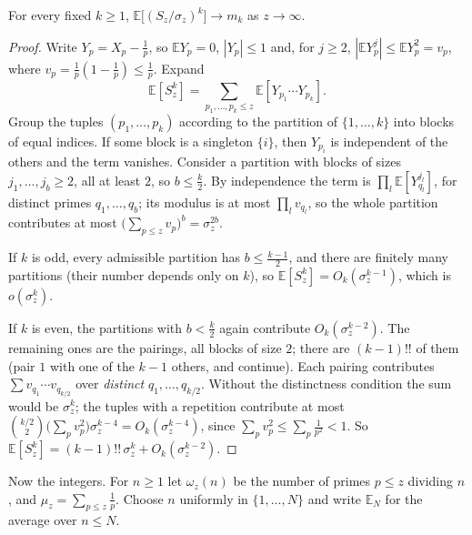 \begin{lemma}\label{lem:modelmoments}
For every fixed $k\ge1$, $\mathbb E\bigl[(S_z/\sigma_z)^k\bigr]\to m_k$ as $z\to\infty$.
\end{lemma}
\begin{proof}
Write $Y_p=X_p-\frac1p$, so $\mathbb E Y_p=0$, $|Y_p|\le1$ and, for $j\ge2$, $|\mathbb E Y_p^j|\le\mathbb E Y_p^2=v_p$, where $v_p=\frac1p(1-\frac1p)\le\frac1p$. Expand
\[
\mathbb E[S_z^k]=\sum_{p_1,\dots,p_k\le z}\mathbb E[Y_{p_1}\cdots Y_{p_k}].
\]
Group the tuples $(p_1,\dots,p_k)$ according to the partition of $\{1,\dots,k\}$ into blocks of equal indices. If some block is a singleton $\{i\}$, then $Y_{p_i}$ is independent of the others and the term
vanishes. Consider a partition with blocks of sizes $j_1,\dots,j_b\ge2$, all at least $2$, so $b\le\frac k2$. By independence the term is $\prod_l\mathbb E[Y_{q_l}^{j_l}]$, for distinct primes $q_1,\dots,q_b$; its modulus is at
most $\prod_lv_{q_l}$, so the whole partition contributes at most $\bigl(\sum_{p\le z}v_p\bigr)^b=\sigma_z^{2b}$.

If $k$ is odd, every admissible partition has $b\le\frac{k-1}2$, and there are finitely many partitions (their number depends only on $k$), so $\mathbb E[S_z^k]=O_k(\sigma_z^{k-1})$, which is $o(\sigma_z^k)$.

If $k$ is even, the partitions with $b<\frac k2$ again contribute $O_k(\sigma_z^{k-2})$. The remaining ones are the pairings, all blocks of size $2$; there are $(k-1)!!$ of them (pair $1$ with one of the $k-1$ others,
and continue). Each pairing contributes $\sum v_{q_1}\cdots v_{q_{k/2}}$ over \emph{distinct} $q_1,\dots,q_{k/2}$. Without the distinctness condition the sum would be $\sigma_z^k$; the tuples with a repetition
contribute at most $\binom{k/2}2\bigl(\sum_pv_p^2\bigr)\sigma_z^{k-4}=O_k(\sigma_z^{k-4})$, since $\sum_pv_p^2\le\sum_p\frac1{p^2}<1$. So $\mathbb E[S_z^k]=(k-1)!!\,\sigma_z^k+O_k(\sigma_z^{k-2})$.
\end{proof}

Now the integers. For $n\ge1$ let $\omega_z(n)$ be the number of primes $p\le z$ dividing $n$, and $\mu_z=\sum_{p\le z}\frac1p$. Choose $n$ uniformly in $\{1,\dots,N\}$ and write $\mathbb E_N$ for the
average over $n\le N$.


